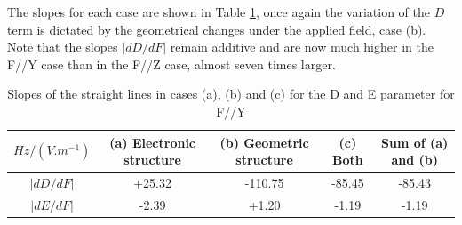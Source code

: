 \documentclass[10pt]{report}
\numberwithin{equation}{section}
\begin{document}

The slopes for each case are shown in Table \ref{tab:Slope_D_Y}, once again the variation of the $D$ term is dictated by the geometrical changes under the applied field, case (b).
Note that the slopes $|dD/dF|$ remain additive and are now much higher in the F//Y case than in the F//Z case, almost seven times larger.
\begin{table}[!ht]
    \begin{tabular}{c | c c c c}
        \hline
        $Hz/(V.m^{-1})$ &  (a) Electronic structure & (b) Geometric structure & (c) Both & Sum of (a) and (b)\\
        \hline
        $|dD/dF|$ & +25.32	& -110.75 & 	-85.45 & 	-85.43\\
        $|dE/dF|$ &-2.39& 	+1.20& 	-1.19& 	-1.19\\
    \end{tabular}
    \caption{Slopes of the straight lines in cases (a), (b) and (c) for the D and E parameter for F//Y}
    \label{tab:Slope_D_Y}
\end{table}
\end{document}
